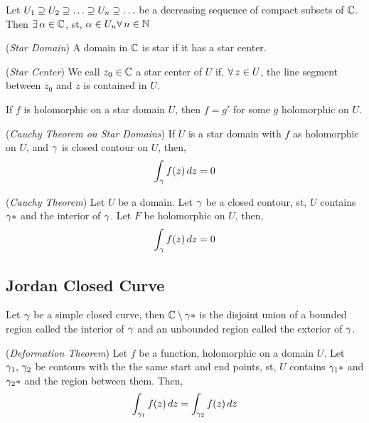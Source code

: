 \documentclass{article}
\begin{document}
\begin{nlemma}
  Let $\displaystyle{U_1 \bus U_2 \bus \dots \bus U_n \bus \dots}$ be a decreasing sequence of compact subsets of $\mathbb{C}$. Then $\exists\,\alpha\in \mathbb{C}$, st, $\alpha \in U_n \forall\, n \in\mathbb{N}$
\end{nlemma}

\begin{ndefi}{(\textit{Star Domain})}
  A domain in $\mathbb{C}$ is star if it has a star center.
\end{ndefi}

\begin{ndefi}{(\textit{Star Center})}
  We call $z_0\in\mathbb{C}$ a star center of $U$ if, $\forall\, z\in U$, the line segment between $z_0$ and $z$ is contained in $U$.
\end{ndefi}

\begin{nthm}
  If $f$ is holomorphic on a star domain $U$, then $f = g'$ for some $g$ holomorphic on $U$.
\end{nthm}

\begin{ncor}{(\textit{Cauchy Theorem on Star Domains})}
  If $U$ is a star domain with $f$ as holomorphic on $U$, and $\gamma$ is closed contour on $U$, then,
 $$ \int_\gamma f(z)\,dz = 0 $$
\end{ncor}

\begin{nthm}{(\textit{Cauchy Theorem})}
  Let $U$ be a domain. Let $\gamma$ be a closed contour, st, $U$ contains $\gamma *$ and the interior of $\gamma$. Let $F$ be holomorphic on $U$, then,
  $$ \int_\gamma f(z)\,dz = 0 $$
\end{nthm}

\subsection{Jordan Closed Curve}
\begin{nthm}
  Let $\gamma$ be a simple closed curve, then $\mathbb{C}\setminus \gamma*$ is the disjoint union of a bounded region called the interior of $\gamma$ and an unbounded region called the exterior of $\gamma$.
\end{nthm}

\begin{nthm}{(\textit{Deformation Theorem})}
  Let $f$ be a function, holomorphic on a domain $U$. Let $\gamma_1,\, \gamma_2$ be contours with the the same start and end points, st, $U$ contains $\gamma_1*$ and $\gamma_2*$ and the region between them. Then,
  $$ \int_{\gamma_1} {f(z)\,dz} = \int_{\gamma_2} {f(z)\,dz} $$
\end{nthm}
\end{document}
